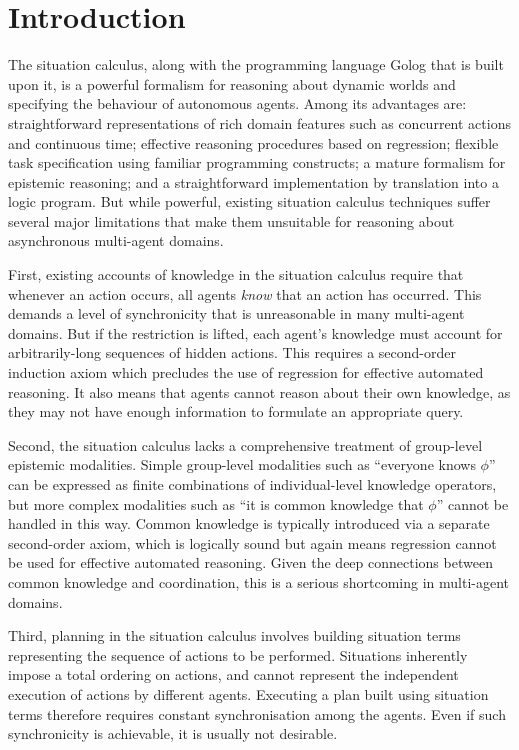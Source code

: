  \onehalfspace


\chapter{Introduction}

The situation calculus, along with the programming language Golog
that is built upon it, is a powerful formalism for reasoning about
dynamic worlds and specifying the behaviour of autonomous agents.
Among its advantages are: straightforward representations of rich
domain features such as concurrent actions and continuous time; effective
reasoning procedures based on regression; flexible task specification
using familiar programming constructs; a mature formalism for epistemic
reasoning; and a straightforward implementation by translation into
a logic program. But while powerful, existing situation calculus techniques
suffer several major limitations that make them unsuitable for reasoning
about asynchronous multi-agent domains.

First, existing accounts of knowledge in the situation calculus require
that whenever an action occurs, all agents \emph{know} that an action
has occurred. This demands a level of synchronicity that is unreasonable
in many multi-agent domains. But if the restriction is lifted, each
agent's knowledge must account for arbitrarily-long sequences of hidden
actions. This requires a second-order induction axiom which precludes
the use of regression for effective automated reasoning. It also means
that agents cannot reason about their own knowledge, as they may not
have enough information to formulate an appropriate query.

Second, the situation calculus lacks a comprehensive treatment of
group-level epistemic modalities. Simple group-level modalities such
as {}``everyone knows $\phi$'' can be expressed as finite combinations
of individual-level knowledge operators, but more complex modalities
such as {}``it is common knowledge that $\phi$'' cannot be handled
in this way. Common knowledge is typically introduced via a separate
second-order axiom, which is logically sound but again means regression
cannot be used for effective automated reasoning. Given the deep connections
between common knowledge and coordination, this is a serious shortcoming
in multi-agent domains.

Third, planning in the situation calculus involves building situation
terms representing the sequence of actions to be performed. Situations
inherently impose a total ordering on actions, and cannot represent
the independent execution of actions by different agents. Executing
a plan built using situation terms therefore requires constant synchronisation
among the agents. Even if such synchronicity is achievable, it is
usually not desirable.\\


